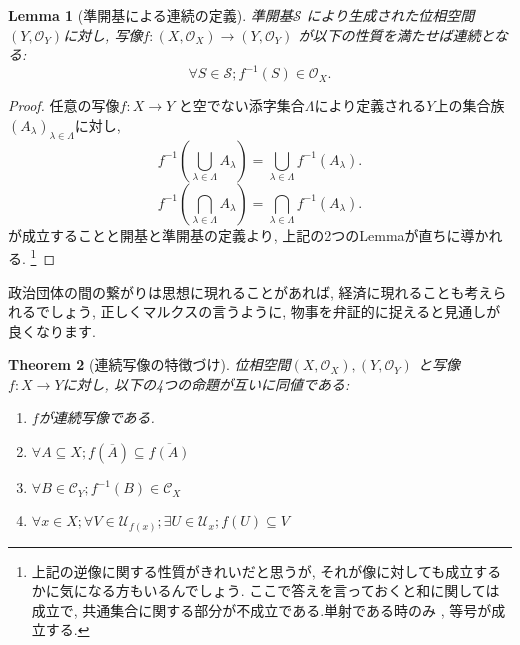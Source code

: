 \documentclass[lualatex]{ltjsbook}
\newcommand{\cl}[1]{\overline{ #1}  }
\newtheorem{theorem}{Theorem}[section]
\newtheorem{lemma}[theorem]{Lemma}
\theoremstyle{remark}
\theoremstyle{plain}
\begin{document}
\begin{lemma}[準開基による連続の定義]
	準開基$\mathcal{S}$ により生成された位相空間$\left( Y, \mathcal{O}_Y \right) $に対し, 写像$f: \left( X , \mathcal{O}_X \right) \to \left( Y, \mathcal{O}_Y \right) $ が以下の性質を満たせば連続となる:
\[
\forall S \in \mathcal{S}; f^{-1}\left( S \right) \in \mathcal{O}_X
.\] 

\end{lemma}

\begin{proof}
	任意の写像$f: X \to Y$ と空でない添字集合$\Lambda$により定義される$Y$上の集合族 $\left( A_{\lambda} \right) _{\lambda \in \Lambda}$に対し,
	\[
	f^{-1}\left( \bigcup_{\lambda \in \Lambda} A_{\lambda}  \right) = \bigcup_{\lambda \in \Lambda} f^{-1}\left( A_\lambda \right) 
	.\] 
	\[
	f^{-1}\left( \bigcap_{\lambda \in \Lambda} A_{\lambda}  \right) = \bigcap_{\lambda \in \Lambda} f^{-1}\left( A_\lambda \right) 
	.\]
	が成立することと開基と準開基の定義より, 上記の2つのLemmaが直ちに導かれる. 
	\footnote{上記の逆像に関する性質がきれいだと思うが, それが像に対しても成立するかに気になる方もいるんでしょう. 
	ここで答えを言っておくと和に関しては成立で, 共通集合に関する部分が{\color{red}不成立}である.単射である時のみ , 等号が成立する.}
\end{proof}

政治団体の間の繋がりは思想に現れることがあれば, 経済に現れることも考えられるでしょう, 正しくマルクスの言うように, 物事を弁証的に捉えると見通しが良くなります.

\begin{theorem}[連続写像の特徴づけ]
	位相空間$\left( X,\mathcal{O}_X \right) ,\left( Y,\mathcal{O}_Y \right) $ と写像$f:X \to Y$に対し, 以下の4つの命題が互いに同値である:
	\begin{enumerate}
		\item $f$が連続写像である.
		\item  $\forall A \subseteq X ; f\left( \cl{A} \right) \subseteq \cl{f\left( A \right) }$ 
		\item $\forall B \in \mathcal{C}_Y; f^{-1}\left( B \right)  \in \mathcal{C}_X$ 
		\item $\forall x \in X; \forall V \in \mathcal{U}_{f(x)};\exists U \in \mathcal{U}_x; f(U) \subseteq V $
	\end{enumerate}
\end{theorem}
\end{document}
